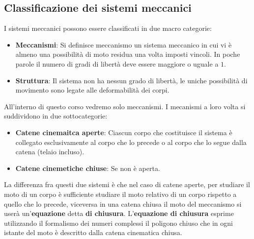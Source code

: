 \subsection{Classificazione dei sistemi meccanici}
I sistemi meccanici possono essere classificati in due macro categorie:
\begin{itemize}
    \item \textbf{Meccanismi}: Si definisce meccanismo un sistema meccanico in cui vi è almeno una possibilità di moto residua una volta imposti vincoli. In poche parole il numero di gradi di libertà deve essere maggiore o uguale a $1$.
    \item \textbf{Struttura}: Il sistema non ha nessun grado di libertà, le uniche possibilità di movimento sono legate alle deformabilità dei corpi.
\end{itemize}
All'interno di questo corso vedremo solo meccanismi.\newline
\newline
I mecanismi a loro volta si suddividono in due sottocategorie:
\begin{itemize}
    \item \textbf{Catene cinemaitca aperte}: Ciascun corpo che costituisce il sistema è collegato esclusivamente al corpo che lo precede o al corpo che lo segue dalla catena (telaio incluso).
    \item \textbf{Catene cinemetiche chiuse}: Se non è aperta.
\end{itemize}
La differenza fra questi due sistemi è che nel caso di catene aperte, per studiare il moto di un corpo è sufficiente studiare il moto relativo di un corpo rispetto a quello che lo precede, viceversa in una catena chiusa il moto del meccanismo si userà un'\textbf{equazione} detta \textbf{di chiusura}.\newline
\newline
L'\textbf{equazione di chiusura} esprime utilizzando il formalismo dei numeri complessi il poligono chiuso che in ogni istante del moto è descritto dalla catena cinematica chiusa.
